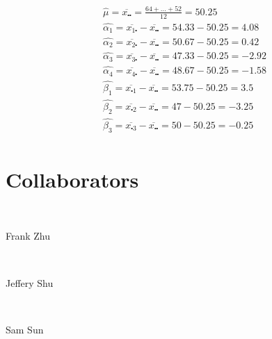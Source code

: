 \documentclass{article}
\begin{document}
~

\begin{align*}
    &\hat{\mu}=\overline{x_{\centerdot\centerdot}}=\frac{64+...+52}{12}=50.25\\
    &\hat{\alpha_1}=\overline{x_{1\centerdot}}-\overline{x_{\centerdot\centerdot}}=54.33-50.25=4.08\\
    &\hat{\alpha_2}=\overline{x_{2\centerdot}}-\overline{x_{\centerdot\centerdot}}=50.67-50.25=0.42\\
    &\hat{\alpha_3}=\overline{x_{3\centerdot}}-\overline{x_{\centerdot\centerdot}}=47.33-50.25=-2.92\\
    &\hat{\alpha_4}=\overline{x_{4\centerdot}}-\overline{x_{\centerdot\centerdot}}=48.67-50.25=-1.58\\
    &\hat{\beta_1}=\overline{x_{\centerdot1}}-\overline{x_{\centerdot\centerdot}}=53.75-50.25=3.5\\
    &\hat{\beta_2}=\overline{x_{\centerdot2}}-\overline{x_{\centerdot\centerdot}}=47-50.25=-3.25\\
    &\hat{\beta_3}=\overline{x_{\centerdot3}}-\overline{x_{\centerdot\centerdot}}=50-50.25=-0.25\\
\end{align*}

\newpage

\section*{Collaborators}

~

Frank Zhu

~

Jeffery Shu

~

Sam Sun
\end{document}

